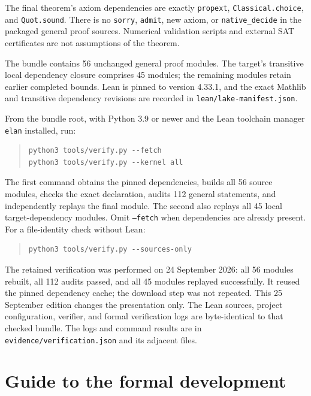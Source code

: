 \documentclass[11pt,letterpaper]{article}
\theoremstyle{remark}
\newcommand{\code}[1]{\texttt{#1}}
\numberwithin{equation}{section}
\begin{document}
The final theorem's axiom dependencies are exactly
\code{propext}, \code{Classical.choice}, and \code{Quot.sound}.
There is no \code{sorry}, \code{admit}, new axiom, or
\code{native\_decide} in the packaged general proof sources. Numerical
validation scripts and external SAT certificates are not assumptions
of the theorem.

The bundle contains 56 unchanged general proof modules. The target's
transitive local dependency closure comprises 45 modules; the remaining
modules retain earlier completed bounds. Lean is pinned to version
4.33.1, and the exact Mathlib and transitive dependency revisions are
recorded in \code{lean/lake-manifest.json}.

\begin{samepage}
From the bundle root, with Python 3.9 or newer and the Lean toolchain
manager \code{elan} installed, run:
\begin{quote}\small
\begin{verbatim}
python3 tools/verify.py --fetch
python3 tools/verify.py --kernel all
\end{verbatim}
\end{quote}
\end{samepage}
The first command obtains the pinned dependencies, builds all 56 source
modules, checks the exact declaration, audits 112 general statements,
and independently replays the final module. The second also replays
all 45 local target-dependency modules. Omit \code{--fetch} when
dependencies are already present. For a file-identity check without Lean:
\begin{quote}\small
\begin{verbatim}
python3 tools/verify.py --sources-only
\end{verbatim}
\end{quote}

The retained verification was performed on 24 September 2026: all 56
modules rebuilt, all 112 audits passed, and all 45 modules replayed
successfully. It reused the pinned dependency cache; the download step
was not repeated. This 25 September edition changes the presentation
only. The Lean sources, project configuration, verifier, and formal
verification logs are byte-identical to that checked bundle. The logs
and command results are in \code{evidence/verification.json} and its
adjacent files.

\section{Guide to the formal development}
\label{app:map}
\end{document}
